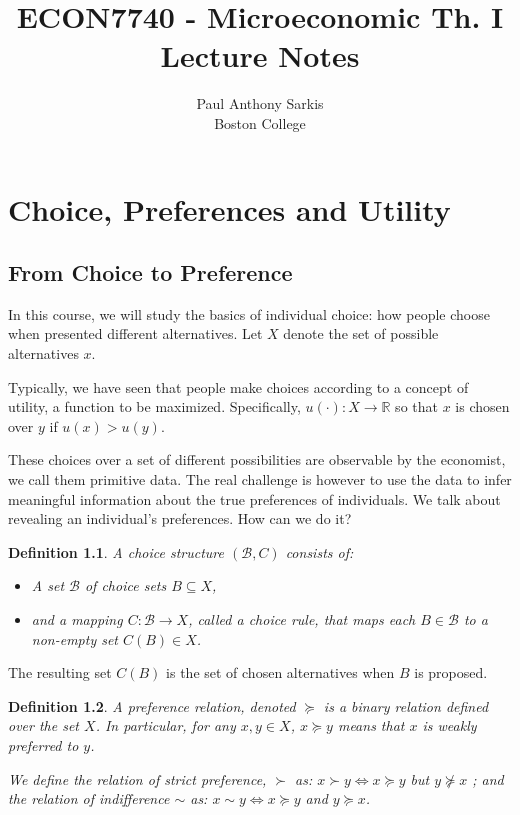 \documentclass[12pt]{report}
\newtheorem{definition}{Definition}[chapter]
\begin{document}
\date{}
\title{ECON7740 - Microeconomic Th. I\\ Lecture Notes}
\author{Paul Anthony Sarkis\\ Boston College} 
 
\maketitle

\tableofcontents

\chapter{Choice, Preferences and Utility}

\section{From Choice to Preference}

In this course, we will study the basics of individual choice: how people choose when presented different alternatives. Let $X$ denote the set of possible alternatives $x$.

Typically, we have seen that people make choices according to a concept of utility, a function to be maximized. Specifically, $u(\cdot):X\to \mathbb{R}$ so that $x$ is chosen over $y$ if $u(x)>u(y)$.

These choices over a set of different possibilities are observable by the economist, we call them primitive data. The real challenge is however to use the data to infer meaningful information about the true preferences of individuals. We talk about revealing an individual's preferences. How can we do it?

\begin{definition}
A choice structure $(\mathcal{B},C)$ consists of:\begin{itemize}
\item A set $\mathcal{B}$ of choice sets $B\subseteq X$,
\item and a mapping $C:\mathcal{B}\to X$, called a choice rule, that maps each $B\in\mathcal{B}$ to a non-empty set $C(B)\in X$.
\end{itemize}
\end{definition}
The resulting set $C(B)$ is the set of chosen alternatives when $B$ is proposed.

\begin{definition}
A preference relation, denoted $\succeq$ is a binary relation defined over the set $X$. In particular, for any $x,y\in X$, $x\succeq y$ means that $x$ is weakly preferred to $y$.

We define the relation of strict preference, $\succ$ as: $x\succ y \Leftrightarrow x\succeq y$ but $y \not\succeq x$ ; and the relation of indifference $\sim$ as: $x\sim y \Leftrightarrow x \succeq y$ and $y \succeq x$. 
\end{definition}
\end{document}
